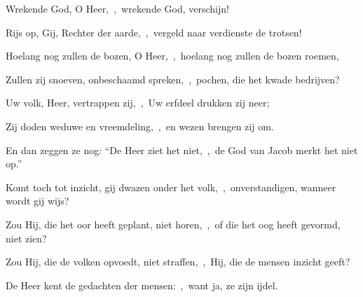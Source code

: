 \documentclass[12pt,twoside,a5paper]{article}
\begin{document}
\begin{halfparskip}
  Wrekende God, O Heer,~\sep\ wrekende God, verschijn!


  Rijs op, Gij, Rechter der aarde,~\sep\ vergeld naar verdienste de trotsen!

  Hoelang nog zullen de bozen, O Heer,~\sep\ hoelang nog zullen de bozen roemen,

  Zullen zij snoeven, onbeschaamd spreken,~\sep\ pochen, die het kwade bedrijven?

  Uw volk, Heer, vertrappen zij,~\sep\ Uw erfdeel drukken zij neer;

  Zij doden weduwe en vreemdeling,~\sep\ en wezen brengen zij om.

  En dan zeggen ze nog: ``De Heer ziet het niet,~\sep\ de God van Jacob merkt het niet op.''
\end{halfparskip}


\begin{halfparskip}
  Komt toch tot inzicht, gij dwazen onder het volk,~\sep\ onverstandigen, wanneer wordt gij wijs?

  Zou Hij, die het oor heeft geplant, niet horen,~\sep\ of die het oog heeft gevormd, niet zien?

  Zou Hij, die de volken opvoedt, niet straffen,~\sep\ Hij, die de mensen inzicht geeft?

  De Heer kent de gedachten der mensen:~\sep\ want ja, ze zijn ijdel.
\end{halfparskip}

\end{document}
